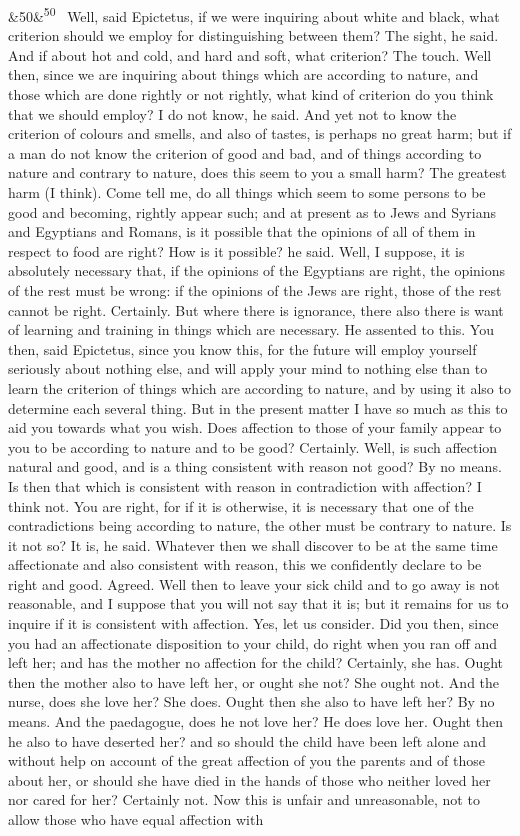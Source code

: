 \documentclass[12pt]{article}
\newcommand{\para}[1][]{\par\noindent\ifx&#1&\else\textsuperscript{\footnotesize #1}~\fi}
\begin{document}
\para[50] Well, said Epictetus, if we were inquiring about white and black, what criterion should we employ for distinguishing between them? The sight, he said. And if about hot and cold, and hard and soft, what criterion? The touch. Well then, since we are inquiring about things which are according to nature, and those which are done rightly or not rightly, what kind of criterion do you think that we should employ? I do not know, he said. And yet not to know the criterion of colours and smells, and also of tastes, is perhaps no great harm; but if a man do not know the criterion of good and bad, and of things according to nature and contrary to nature, does this seem to you a small harm? The greatest harm (I think). Come tell me, do all things which seem to some persons to be good and becoming, rightly appear such; and at present as to Jews and Syrians and Egyptians and Romans, is it possible that the opinions of all of them in respect to food are right? How is it possible? he said. Well, I suppose, it is absolutely necessary that, if the opinions of the Egyptians are right, the opinions of the rest must be wrong: if the opinions of the Jews are right, those of the rest cannot be right. Certainly. But where there is ignorance, there also there is want of learning and training in things which are necessary. He assented to this. You then, said Epictetus, since you know this, for the future will employ yourself seriously about nothing else, and will apply your mind to nothing else than to learn the criterion of things which are according to nature, and by using it also to determine each several thing. But in the present matter I have so much as this to aid you towards what you wish. Does affection to those of your family appear to you to be according to nature and to be good? Certainly. Well, is such affection natural and good, and is a thing consistent with reason not good? By no means. Is then that which is consistent with reason in contradiction with affection? I think not. You are right, for if it is otherwise, it is necessary that one of the contradictions being according to nature, the other must be contrary to nature. Is it not so? It is, he said. Whatever then we shall discover to be at the same time affectionate and also consistent with reason, this we confidently declare to be right and good. Agreed. Well then to leave your sick child and to go away is not reasonable, and I suppose that you will not say that it is; but it remains for us to inquire if it is consistent with affection. Yes, let us consider. Did you then, since you had an affectionate disposition to your child, do right when you ran off and left her; and has the mother no affection for the child? Certainly, she has. Ought then the mother also to have left her, or ought she not? She ought not. And the nurse, does she love her? She does. Ought then she also to have left her? By no means. And the paedagogue, does he not love her? He does love her. Ought then he also to have deserted her? and so should the child have been left alone and without help on account of the great affection of you the parents and of those about her, or should she have died in the hands of those who neither loved her nor cared for her? Certainly not. Now this is unfair and unreasonable, not to allow those who have equal affection with 
\end{document}
